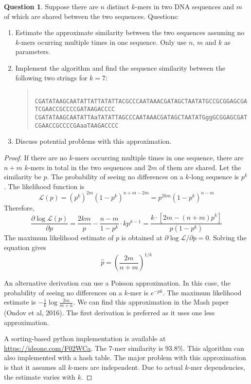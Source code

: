 \documentclass{article}[10pt]
\theoremstyle{definition}\newtheorem{question}{Question}
\begin{document}
\begin{question}
Suppose there are $n$ distinct $k$-mers in two DNA sequences and $m$ of which are
shared between the two sequences. Questions:
\begin{enumerate}
\item Estimate the approximate similarity between the two sequences assuming no
$k$-mers ocurring multiple times in one sequence. Only use $n$, $m$ and $k$ as
parameters.
\item Implement the algorithm and find the sequence similarity between the following two strings for $k=7$:
\begin{quote}
\footnotesize\tt
CGATATAAGCAATATTATTATATTACGCCCAATAAACGATAGCTAATATGCCGCGGAGCGATCGAACCGCCCCGATAAGACCCC\\
CGATATAAGCAATATTAaTATATTAGCCCAATAAACGATAGCTAATATGggGCGGAGCGATCGAACCGCCCCGAaaTAAGACCCC
\end{quote}
\item Discuss potential problems with this approximation.
\end{enumerate}
\end{question}

\begin{proof}
If there are no $k$-mers occurring multiple times in one sequence, there are
$n+m$ $k$-mers in total in the two sequences and $2m$ of them are shared.
Let the similarity be $p$. The probability of seeing no differences on a
$k$-long sequence is $p^k$. The likelihood function is
$$
\mathcal{L}(p)=\left(p^k\right)^{2m}\left(1-p^k\right)^{n+m-2m}=p^{2km}\left(1-p^k\right)^{n-m}
$$
Therefore,
$$
\frac{\partial\log\mathcal{L}(p)}{\partial p}=\frac{2km}{p}-\frac{n-m}{1-p^k}\cdot kp^{k-1}=\frac{k\cdot\left[2m-(n+m)p^k\right]}{p\left(1-p^k\right)}
$$
The maximum likelihood estimate of $p$ is obtained at
$\partial\log\mathcal{L}/\partial p=0$. Solving the equation gives
$$
\hat{p}=\left(\frac{2m}{n+m}\right)^{1/k}
$$

An alternative derivation can use a Poisson approximation. In this case, the
probability of seeing no differences on a $k$-mer is $e^{-pk}$. The maximum
likelihood estimate is $-\frac{1}{k}\log\frac{2m}{m+n}$. We can find this
approximation in the Mash paper (Ondov et al, 2016). The first derivation is
preferred as it uses one less approximation.

A sorting-based python implementation is available at
\href{https://ideone.com/F02WCa}{https://ideone.com/F02WCa}. The 7-mer
similarity is 93.8\%. This algorithm can also implemented with a hash table.
The major problem with this approximation is that it assumes all $k$-mers are
independent. Due to actual $k$-mer dependencies, the estimate varies with $k$.
\end{proof}
\end{document}
